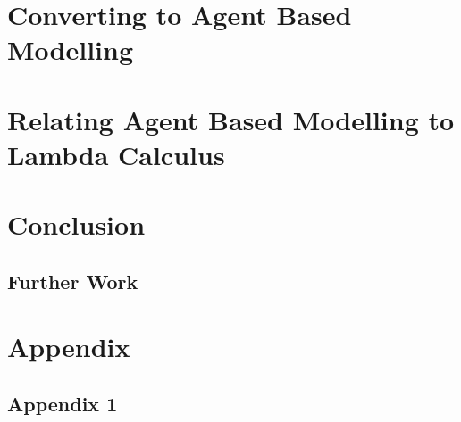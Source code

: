 \documentclass{article}
\begin{document}
\section{Converting to Agent Based Modelling}

\section{Relating Agent Based Modelling to Lambda Calculus}

\section{Conclusion}
\subsection{Further Work}

 
\section{Appendix}

\subsection{Appendix 1} %
%











     
\end{document}
